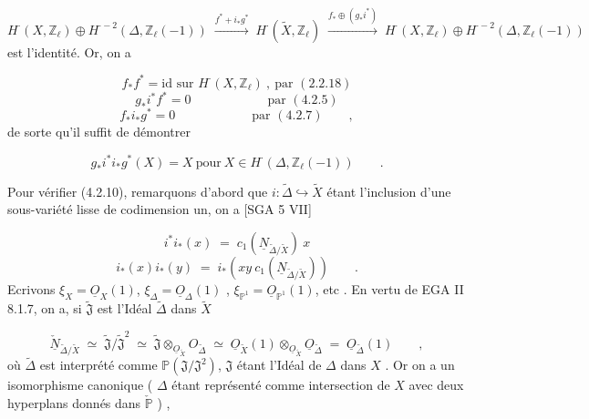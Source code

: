 \begin{equation}\tag{4.2.9}
H^{\cdot}(X,\mathbb{Z}_\ell) \oplus H^{\cdot-2}(\Delta,\mathbb{Z}_\ell(-1)) \;\stackrel{f^*+i_*g^*}{\longrightarrow}\; H^{\cdot}(\widetilde{X},\mathbb{Z}_\ell) \;\stackrel{f_*\oplus(g_*i^*)}{\longrightarrow}\; H^{\cdot}(X,\mathbb{Z}_\ell)\oplus H^{\cdot-2}(\Delta,\mathbb{Z}_\ell(-1))
\end{equation}
est l'identité. Or, on a

\begin{equation*}
f_*f^* = \text{id sur } H^{\cdot}(X,\mathbb{Z}_\ell) \ , \ \text{par } (2.2.18)
\end{equation*}
\begin{equation*}
g_*i^*f^* = 0 \qquad\qquad\qquad \text{par } (4.2.5)
\end{equation*}
\begin{equation*}
f_*i_*g^* = 0 \qquad\qquad\qquad \text{par } (4.2.7) \qquad ,
\end{equation*}
de sorte qu'il suffit de démontrer

\begin{equation}\tag{4.2.10}
g_*i^*i_*g^*(X) = X \ \text{pour} \ X \in H^{\cdot}(\Delta,\mathbb{Z}_\ell(-1)) \qquad .
\end{equation}


Pour vérifier (4.2.10), remarquons d'abord que $i : \widetilde{\Delta} \hookrightarrow \widetilde{X}$ étant l'inclusion d'une sous-variété lisse de codimension un, on a [SGA 5 VII]

\begin{equation}\tag{4.2.11}
i^*i_*(x) \;=\; c_1(\underline{N}_{\widetilde{\Delta}/\widetilde{X}}) \ x
\end{equation}
\begin{equation}\tag{4.2.12}
i_*(x)i_*(y) \;=\; i_*(xy \ c_1(\underline{N}_{\widetilde{\Delta}/\widetilde{X}})) \qquad .
\end{equation}
Ecrivons $\xi_X = \underline{O}_X(1)$, $\xi_\Delta = \underline{O}_\Delta(1)$ , $\xi_{\mathbb{P}^1} = \underline{O}_{\mathbb{P}^1}(1)$, etc . En vertu de EGA II 8.1.7, on a, si $\widetilde{\mathfrak{J}}$ est l'Idéal $\widetilde{\Delta}$ dans $\widetilde{X}$

\begin{equation}\tag{4.2.13}
\underline{\check{N}}_{\widetilde{\Delta}/\widetilde{X}} \;\simeq\; \widetilde{\mathfrak{J}}/\widetilde{\mathfrak{J}}^2 \;\simeq\; \widetilde{\mathfrak{J}} \otimes_{\underline{O}_{\widetilde{X}}} O_{\widetilde{\Delta}} \;\simeq\; \underline{O}_{\widetilde{X}}(1) \otimes_{\underline{O}_{\widetilde{X}}} \underline{O}_{\widetilde{\Delta}} \;=\; \underline{O}_{\widetilde{\Delta}}(1) \qquad ,
\end{equation}
où $\widetilde{\Delta}$ est interprété comme $\mathbb{P}(\mathfrak{J}/\mathfrak{J}^2)$, $\mathfrak{J}$ étant l'Idéal de $\Delta$ dans $X$ . Or on a un isomorphisme canonique ( $\Delta$ étant représenté comme intersection de $X$ avec deux hyperplans  donnés dans $\check{\mathbb{P}}$ ) ,

